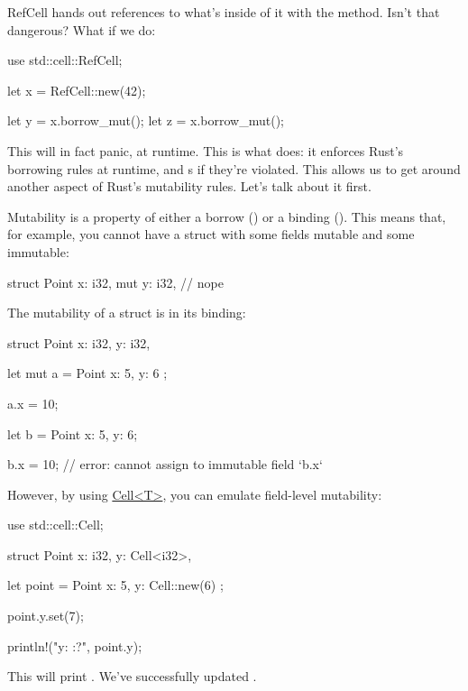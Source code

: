 RefCell hands out  references to what's inside of it with the  method. Isn't that dangerous? What if 
we do:

\begin{rustc}
use std::cell::RefCell;

let x = RefCell::new(42);

let y = x.borrow_mut();
let z = x.borrow_mut();
\end{rustc}

This will in fact panic, at runtime. This is what  does: it enforces Rust's borrowing rules at runtime, and 
\panic s if they're violated. This allows us to get around another aspect of Rust's mutability rules. Let's talk about it 
first.


Mutability is a property of either a borrow () or a binding (). This means that, for example, you cannot 
have a struct with some fields mutable and some immutable:

\begin{rustc}
struct Point {
    x: i32,
    mut y: i32, // nope
}
\end{rustc}

The mutability of a struct is in its binding:

\begin{rustc}
struct Point {
    x: i32,
    y: i32,
}

let mut a = Point { x: 5, y: 6 };

a.x = 10;

let b = Point { x: 5, y: 6};

b.x = 10; // error: cannot assign to immutable field `b.x`
\end{rustc}

However, by using \href{https://doc.rust-lang.org/std/cell/struct.Cell.html}{Cell<T>}, you can emulate field-level mutability:

\begin{rustc}
use std::cell::Cell;

struct Point {
    x: i32,
    y: Cell<i32>,
}

let point = Point { x: 5, y: Cell::new(6) };

point.y.set(7);

println!("y: {:?}", point.y);
\end{rustc}

This will print . We've successfully updated \y.
